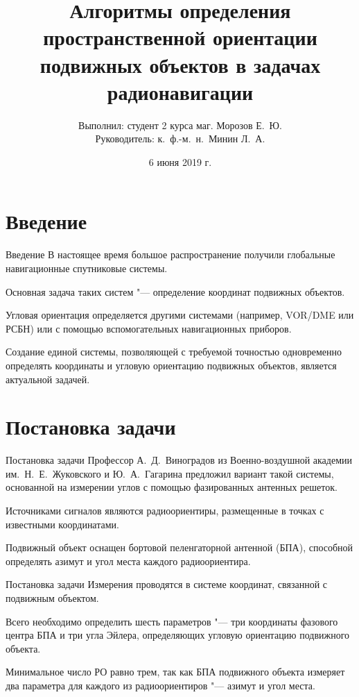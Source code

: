 \documentclass[russian,hyperref={unicode}]{beamer}
\title{Алгоритмы определения пространственной ориентации подвижных объектов в задачах радионавигации}
\institute
{
  Воронежский Государственный Университет \\
  Факультет Компьютерных Наук \\
  Кафедра Цифровых Технологий
}
\author
{
  Выполнил: студент 2 курса маг. Морозов Е.~Ю. \\
  Руководитель: к.~ф.-м.~н.~Минин Л.~А.
}
\date{6 июня 2019 г.}
\begin{document}
  \frame{\titlepage}

  \section{Введение}
  \begin{frame}{Введение}
    В настоящее время большое распространение получили глобальные навигационные спутниковые системы.

    Основная задача таких систем "--- определение координат подвижных объектов.

    Угловая ориентация определяется другими системами (например, VOR/DME или РСБН) или с помощью вспомогательных навигационных приборов.

    Создание единой системы, позволяющей с требуемой точностью одновременно определять координаты и угловую ориентацию подвижных объектов, является актуальной задачей.~\nocite{WMMU:2019:IIS, WMMU:2019:RLNC, WMM:2018}
  \end{frame}

  \section{Постановка задачи}
  \begin{frame}{Постановка задачи}
    Профессор А.~Д.~Виноградов из Военно-воздушной академии им.~Н.~Е.~Жуковского и Ю.~А.~Гагарина предложил вариант такой системы, основанной на измерении углов с помощью фазированных антенных решеток.

    Источниками сигналов являются радиоориентиры, размещенные в точках с известными координатами.

    Подвижный объект оснащен бортовой пеленгаторной антенной (БПА), способной определять азимут и угол места каждого радиоориентира.
  \end{frame}

  \begin{frame}{Постановка задачи}
    Измерения проводятся в системе координат, связанной с подвижным объектом.

    Всего необходимо определить шесть параметров "--- три координаты фазового центра БПА и три угла Эйлера, определяющих угловую ориентацию подвижного объекта.

    Минимальное число РО равно трем, так как БПА подвижного объекта измеряет два параметра для каждого из радиоориентиров "--- азимут и угол места.
  \end{frame}
\end{document}
